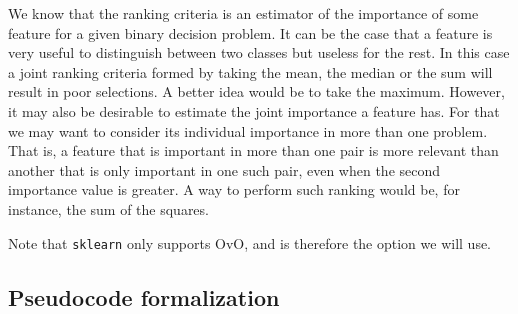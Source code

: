 We know that the ranking criteria is an estimator of the importance of some feature for a given binary decision problem. It can be the case that a feature is very useful to distinguish between two classes but useless for the rest. In this case a joint ranking criteria formed by taking the mean, the median or the sum will result in poor selections. A better idea would be to take the maximum. However, it may also be desirable to estimate the joint importance a feature has. For that we may want to consider its individual importance in more than one problem. That is, a feature that is important in more than one pair is more relevant than another that is only important in one such pair, even when the second importance value is greater. A way to perform such ranking would be, for instance, the sum of the squares.

Note that \texttt{sklearn} only supports OvO, and is therefore the option we will use.

\subsection{Pseudocode formalization}

